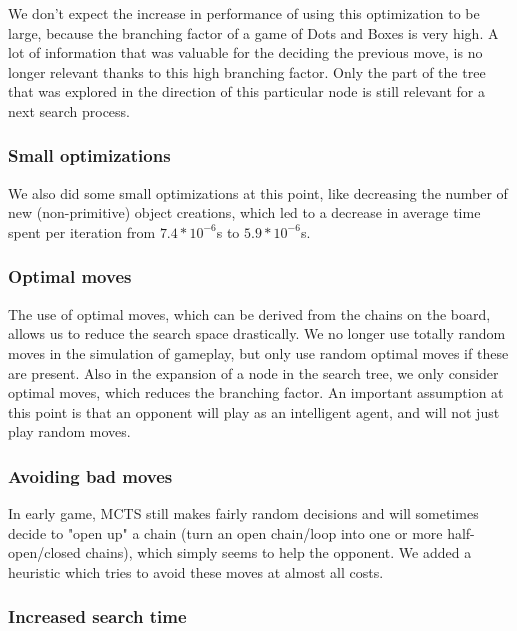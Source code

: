 	We don't expect the increase in performance of using this optimization to be large, because the branching factor of a game of Dots and Boxes is very high. A lot of information that was valuable for the deciding the previous move, is no longer relevant thanks to this high branching factor. Only the part of the tree that was explored in the direction of this particular node is still relevant for a next search process.

	\subsubsection{Small optimizations}
	
	We also did some small optimizations at this point, like decreasing the number of new (non-primitive) object creations, which led to a decrease in average time spent per iteration from $7.4*10^{-6}$s to $5.9*10^{-6}$s.
	
	\subsubsection{Optimal moves\label{s:optimalMoves}}
	
	The use of optimal moves, which can be derived from the chains on the board, allows us to reduce the search space drastically. We no longer use totally random moves in the simulation of gameplay, but only use random optimal moves if these are present. Also in the expansion of a node in the search tree, we only consider optimal moves, which reduces the branching factor.
	An important assumption at this point is that an opponent will play as an intelligent agent, and will not just play random moves. 
	
	\subsubsection{Avoiding bad moves}
	
	In early game, MCTS still makes fairly random decisions and will sometimes decide to "open up" a chain (turn an open chain/loop into one or more half-open/closed chains), which simply seems to help the opponent. We added a heuristic which tries to avoid these moves at almost all costs.
	
	\subsubsection{Increased search time}